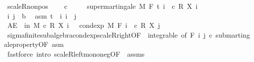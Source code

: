 \begin{isabellebody}
%
\isadelimproof
\isanewline
%
\endisadelimproof
\isanewline
{}\isamarkupfalse%
\ scaleR{\isacharunderscore}{\kern0pt}nonpos{\isacharcolon}{\kern0pt}\ \isanewline
\ \ \ {\isachardoublequoteopen}c\ {\isasymle}\ {}{\isachardoublequoteclose}\isanewline
\ \ \ {\isachardoublequoteopen}supermartingale\ M\ F\ t\ {\isacharparenleft}{\kern0pt}{\isasymlambda}i\ {\isasymxi}{\isachardot}{\kern0pt}\ c\ {\isacharasterisk}{\kern0pt}\isactrlsub R\ X\ i\ {\isasymxi}{\isacharparenright}{\kern0pt}{\isachardoublequoteclose}\isanewline
%
\isadelimproof
%
\endisadelimproof
%
\isatagproof
{}\isamarkupfalse%
\isanewline
\ \ \isacommand{{\isacharbraceleft}{\kern0pt}}\isamarkupfalse%
\isanewline
\ \ \ \ \isamarkupfalse%
\ i\ j\ {\isacharcolon}{\kern0pt}{\isacharcolon}{\kern0pt}\ {\isacharprime}{\kern0pt}b\ \isamarkupfalse%
\ asm{\isacharcolon}{\kern0pt}\ {\isachardoublequoteopen}t\ {\isasymle}\ i{\isachardoublequoteclose}\ {\isachardoublequoteopen}i\ {\isasymle}\ j{\isachardoublequoteclose}\isanewline
\ \ \ \ \isamarkupfalse%
\ {\isachardoublequoteopen}AE\ {\isasymxi}\ in\ M{\isachardot}{\kern0pt}\ c\ {\isacharasterisk}{\kern0pt}\isactrlsub R\ X\ i\ {\isasymxi}\ {\isasymge}\ cond{\isacharunderscore}{\kern0pt}exp\ M\ {\isacharparenleft}{\kern0pt}F\ i{\isacharparenright}{\kern0pt}\ {\isacharparenleft}{\kern0pt}{\isasymlambda}{\isasymxi}{\isachardot}{\kern0pt}\ c\ {\isacharasterisk}{\kern0pt}\isactrlsub R\ X\ j\ {\isasymxi}{\isacharparenright}{\kern0pt}\ {\isasymxi}{\isachardoublequoteclose}\ \isanewline
\ \ \ \ \ \ \isamarkupfalse%
\ sigma{\isacharunderscore}{\kern0pt}finite{\isacharunderscore}{\kern0pt}subalgebra{\isachardot}{\kern0pt}cond{\isacharunderscore}{\kern0pt}exp{\isacharunderscore}{\kern0pt}scaleR{\isacharunderscore}{\kern0pt}right{\isacharbrackleft}{\kern0pt}OF\ {\isacharunderscore}{\kern0pt}\ integrable{\isacharcomma}{\kern0pt}\ of\ {\isachardoublequoteopen}F\ i{\isachardoublequoteclose}\ j\ c{\isacharbrackright}{\kern0pt}\ submartingale{\isacharunderscore}{\kern0pt}property{\isacharbrackleft}{\kern0pt}OF\ asm{\isacharbrackright}{\kern0pt}\ \isanewline
\ \ \ \ \ \ \ \ \ \ \ \ \isamarkupfalse%
\ {\isacharparenleft}{\kern0pt}fastforce\ intro{\isacharbang}{\kern0pt}{\isacharcolon}{\kern0pt}\ scaleR{\isacharunderscore}{\kern0pt}left{\isacharunderscore}{\kern0pt}mono{\isacharunderscore}{\kern0pt}neg{\isacharbrackleft}{\kern0pt}OF\ {\isacharunderscore}{\kern0pt}\ assms{\isacharbrackright}{\kern0pt}{\isacharparenright}{\kern0pt}\isanewline

\end{isabellebody}
